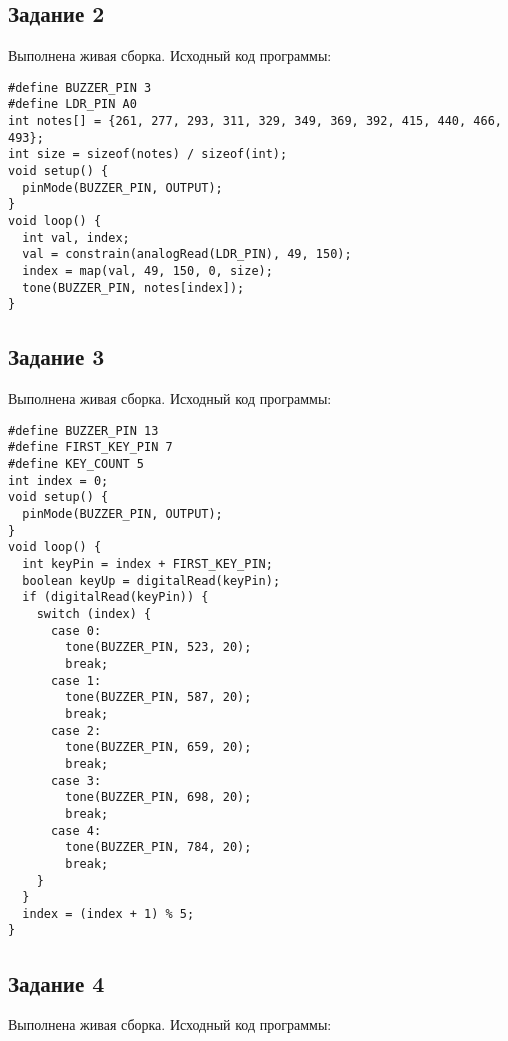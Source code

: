 \documentclass[a4paper,14pt]{extarticle}
\begin{document}
  \subsection*{\hspace{12.5mm}Задание 2}
  Выполнена живая сборка. Исходный код программы:

  \begingroup
  \fontsize{14pt}{10pt}\selectfont
  \linespread{1}
  \begin{verbatim}
#define BUZZER_PIN 3
#define LDR_PIN A0
int notes[] = {261, 277, 293, 311, 329, 349, 369, 392, 415, 440, 466, 493};
int size = sizeof(notes) / sizeof(int);
void setup() {
  pinMode(BUZZER_PIN, OUTPUT);
}
void loop() {
  int val, index;
  val = constrain(analogRead(LDR_PIN), 49, 150);
  index = map(val, 49, 150, 0, size);
  tone(BUZZER_PIN, notes[index]);
}
  \end{verbatim}
  \endgroup

  \subsection*{\hspace{12.5mm}Задание 3}
  Выполнена живая сборка. Исходный код программы:

  \begingroup
  \fontsize{14pt}{10pt}\selectfont
  \linespread{1}
  \begin{verbatim}
#define BUZZER_PIN 13
#define FIRST_KEY_PIN 7
#define KEY_COUNT 5
int index = 0;
void setup() {
  pinMode(BUZZER_PIN, OUTPUT);
}
void loop() {
  int keyPin = index + FIRST_KEY_PIN;
  boolean keyUp = digitalRead(keyPin);
  if (digitalRead(keyPin)) {
    switch (index) {
      case 0:
        tone(BUZZER_PIN, 523, 20);
        break;
      case 1:
        tone(BUZZER_PIN, 587, 20);
        break;
      case 2:
        tone(BUZZER_PIN, 659, 20);
        break;
      case 3:
        tone(BUZZER_PIN, 698, 20);
        break;
      case 4:
        tone(BUZZER_PIN, 784, 20);
        break;
    }
  }
  index = (index + 1) % 5;
}
  \end{verbatim}
  \endgroup

  \subsection*{\hspace{12.5mm}Задание 4}
  Выполнена живая сборка. Исходный код программы:
\end{document}

